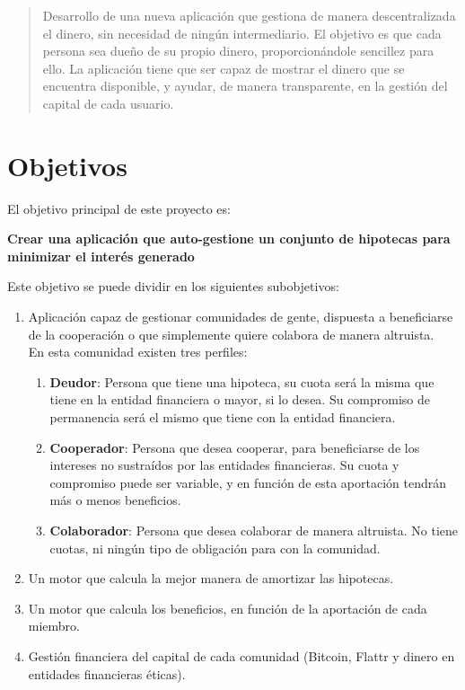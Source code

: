 \documentclass[10pt]{article}
\begin{document}
\title{}
\author{Diego Pardilla}
\date{\today}


\maketitle

\begin{abstract}
Desarrollo de una nueva aplicación que gestiona de manera descentralizada el dinero, sin necesidad de ningún intermediario. El objetivo es que cada persona sea dueño de su propio dinero, proporcionándole sencillez para ello. La aplicación tiene que ser capaz de mostrar el dinero que se encuentra disponible, y ayudar, de manera transparente, en la gestión del capital de cada usuario.  
\end{abstract}

\section{Objetivos}

El objetivo principal de este proyecto es:

\begin{center}
\bf{Crear una aplicación que auto-gestione un conjunto de hipotecas para minimizar el interés generado}
\end{center}

Este objetivo se puede dividir en los siguientes subobjetivos:

\begin{enumerate}
  \item Aplicación capaz de gestionar comunidades de gente, dispuesta a beneficiarse de la cooperación o que simplemente quiere colabora de manera altruista.\\ 
En esta comunidad existen tres perfiles:
\begin{enumerate}
\item \textbf{Deudor}: Persona que tiene una hipoteca, su cuota será la misma que tiene en la entidad financiera o mayor, si lo desea. Su compromiso de permanencia será el mismo que tiene con la entidad financiera.
\item \textbf{Cooperador}: Persona que desea cooperar, para beneficiarse de los intereses no sustraídos por las entidades financieras. Su cuota y compromiso puede ser variable, y en función de esta aportación tendrán más o menos beneficios.
\item \textbf{Colaborador}: Persona que desea colaborar de manera altruista. No tiene cuotas, ni ningún tipo de obligación para con la comunidad.
\end{enumerate}
  \item Un motor que calcula la mejor manera de amortizar las hipotecas.
  \item Un motor que calcula los beneficios, en función de la aportación de cada miembro.
  \item Gestión financiera del capital de cada comunidad (Bitcoin, Flattr y dinero en entidades financieras éticas).
\end{enumerate}
\end{document}
